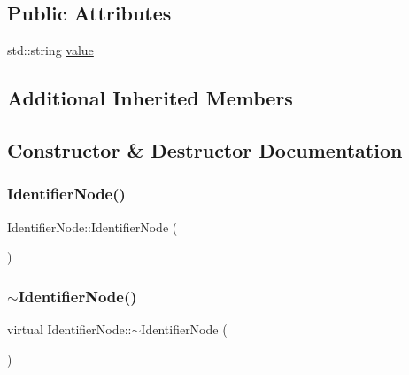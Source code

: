 \subsection*{Public Attributes}
\begin{DoxyCompactItemize}
\item 
std\+::string \hyperlink{classIdentifierNode_a7d92bad6e678bdff5f87f53bd55a53fb}{value}
\end{DoxyCompactItemize}
\subsection*{Additional Inherited Members}


\subsection{Constructor \& Destructor Documentation}
\mbox{\label{classIdentifierNode_ad12eaa3766a9650ce45b8188a9943755}} 
\subsubsection{\texorpdfstring{Identifier\+Node()}{IdentifierNode()}}
{\footnotesize\ttfamily Identifier\+Node\+::\+Identifier\+Node (\begin{DoxyParamCaption}{ }\end{DoxyParamCaption})}

\mbox{\label{classIdentifierNode_a1c6fac2ceb5c9b7a435006b41898aa31}} 
\subsubsection{\texorpdfstring{$\sim$\+Identifier\+Node()}{~IdentifierNode()}}
{\footnotesize\ttfamily virtual Identifier\+Node\+::$\sim$\+Identifier\+Node (\begin{DoxyParamCaption}{ }\end{DoxyParamCaption})\hspace{0.3cm}{\ttfamily [virtual]}}



